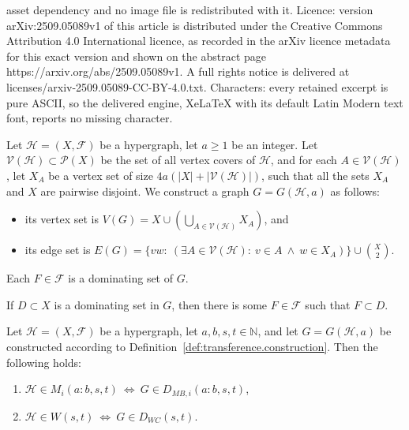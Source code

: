 \documentclass[10pt,a4paper]{amsart}
\newcommand{\calF}{\mathcal{F}}
\newcommand{\calH}{\mathcal{H}}
\newcommand{\calV}{\mathcal{V}}
\begin{document}
asset dependency and no image file is redistributed with it. Licence: version arXiv:2509.05089v1 of this article is distributed under the Creative Commons Attribution 4.0 International licence, as recorded in the arXiv licence metadata for this exact version and shown on the abstract page https://arxiv.org/abs/2509.05089v1. A full rights notice is delivered at licenses/arxiv-2509.05089-CC-BY-4.0.txt. Characters: every retained excerpt is pure ASCII, so the delivered engine, XeLaTeX with its default Latin Modern text font, reports no missing character.
\begin{definition}\label{def:transference.construction}
Let $\calH = (X,\calF)$ be a hypergraph,
let $a\geq 1$ be an integer.
Let $\calV(\calH) \subset \mathcal{P}(X)$ be the set of all vertex covers of $\calH$, and for each $A\in \calV(\calH)$, 
let $X_A$ be a vertex set of size $4a(|X| + |\calV(\calH)|)$,
such that all the sets $X_A$ and $X$ are pairwise disjoint.
We construct a graph $G=G(\calH,a)$
as follows:
\begin{itemize}
\item its vertex set is 
$V(G)=X\cup (\bigcup_{A\in \calV(\calH)} X_A)$, and
\item its edge set is $E(G)=\{vw:~ (\exists A\in \calV(\calH):~v\in A ~ \land ~ w\in X_A)\} \cup \binom{X}{2}$.
\end{itemize}
\end{definition}

\begin{claim}\label{clm:transference.claim1}
Each $F\in \calF$ is a dominating set of $G$.
\end{claim}

\begin{claim}\label{clm:transference.claim3}
If $D\subset X$ is a dominating set in $G$, then there is some $F\in\mathcal{F}$ such that $F\subset D$.
\end{claim}

\begin{lemma}\label{lemma:from.H.to.G}
Let $\calH =(X,\mathcal{F})$ be a hypergraph, 
let $a,b,s,t\in\mathbb{N}$, and let $G=G(\mathcal{H},a)$ be constructed according to Definition~\ref{def:transference.construction}. 
Then the following holds:
\begin{enumerate}
\item[(M)] $\mathcal{H} \in M_i(a:b,s,t) ~ \Leftrightarrow ~ G \in D_{MB,i}(a:b,s,t)$,
\item[(W)] $\mathcal{H} \in W(s,t) ~ \Leftrightarrow ~ G \in D_{WC}(s,t)$.
\end{enumerate}
\end{lemma}
\end{document}
